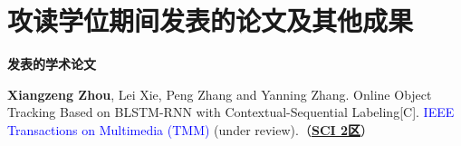 
\chapter{攻读\cxuewei 学位期间发表的论文及其他成果}

\setlength{\parindent}{0em}
\textbf{发表的学术论文}
\begin{publist}
  \item {\bf Xiangzeng Zhou}, Lei Xie, Peng Zhang and Yanning Zhang. Online Object Tracking Based on BLSTM-RNN with Contextual-Sequential Labeling[C]. \textcolor{blue}{IEEE Transactions on Multimedia (TMM)} (under review).（\underline{\bf SCI 2区}）
\end{publist}
\vspace{1cm}

